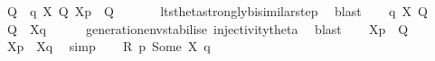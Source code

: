 \begin{isabellebody}
\ Q{\isacharprime}{\kern0pt}\ \ {\isacartoucheopen}{\isasymtheta}{\isacharparenleft}{\kern0pt}q{\isacharparenright}{\kern0pt}\ {\isasymlongmapsto}\isactrlsup {\isasymtheta}{\isasymepsilon}{\isacharbrackleft}{\kern0pt}X{\isacharbrackright}{\kern0pt}\ Q{\isacharprime}{\kern0pt}{\isacartoucheclose}\ {\isacartoucheopen}{\isasymtheta}{\isacharbrackleft}{\kern0pt}X{\isacharbrackright}{\kern0pt}{\isacharparenleft}{\kern0pt}p{\isacharparenright}{\kern0pt}\ {\isasymleftrightarrow}\ Q{\isacharprime}{\kern0pt}{\isacartoucheclose}\ \isanewline
\ \ \ \ \isamarkupfalse%
\ lts{\isacharunderscore}{\kern0pt}theta{\isachardot}{\kern0pt}strongly{\isacharunderscore}{\kern0pt}bisimilar{\isacharunderscore}{\kern0pt}step{\isacharparenleft}{\kern0pt}{}{\isacharparenright}{\kern0pt}\ \isamarkupfalse%
\ blast\isanewline
\ \ \isamarkupfalse%
\ {\isacartoucheopen}{\isasymtheta}{\isacharparenleft}{\kern0pt}q{\isacharparenright}{\kern0pt}\ {\isasymlongmapsto}\isactrlsup {\isasymtheta}{\isasymepsilon}{\isacharbrackleft}{\kern0pt}X{\isacharbrackright}{\kern0pt}\ Q{\isacharprime}{\kern0pt}{\isacartoucheclose}\ \isamarkupfalse%
\ {\isacartoucheopen}Q{\isacharprime}{\kern0pt}\ {\isacharequal}{\kern0pt}\ {\isasymtheta}{\isacharbrackleft}{\kern0pt}X{\isacharbrackright}{\kern0pt}{\isacharparenleft}{\kern0pt}q{\isacharparenright}{\kern0pt}{\isacartoucheclose}\isanewline
\ \ \ \ \isamarkupfalse%
\ generation{\isacharunderscore}{\kern0pt}env{\isacharunderscore}{\kern0pt}stabilise\ injectivity{\isacharunderscore}{\kern0pt}theta{\isacharparenleft}{\kern0pt}{}{\isacharparenright}{\kern0pt}\ \isamarkupfalse%
\ blast\isanewline
\ \ \isamarkupfalse%
\ {\isacartoucheopen}{\isasymtheta}{\isacharbrackleft}{\kern0pt}X{\isacharbrackright}{\kern0pt}{\isacharparenleft}{\kern0pt}p{\isacharparenright}{\kern0pt}\ {\isasymleftrightarrow}\ Q{\isacharprime}{\kern0pt}{\isacartoucheclose}\ \isamarkupfalse%
\ {\isacartoucheopen}{\isasymtheta}{\isacharbrackleft}{\kern0pt}X{\isacharbrackright}{\kern0pt}{\isacharparenleft}{\kern0pt}p{\isacharparenright}{\kern0pt}\ {\isasymleftrightarrow}\ {\isasymtheta}{\isacharbrackleft}{\kern0pt}X{\isacharbrackright}{\kern0pt}{\isacharparenleft}{\kern0pt}q{\isacharparenright}{\kern0pt}{\isacartoucheclose}\ \isamarkupfalse%
\ simp\isanewline
\ \ \isamarkupfalse%
\ {\isacartoucheopen}{\isacharquery}{\kern0pt}R\ p\ {\isacharparenleft}{\kern0pt}Some\ X{\isacharparenright}{\kern0pt}\ q{\isacartoucheclose}\ \isamarkupfalse%

\end{isabellebody}
